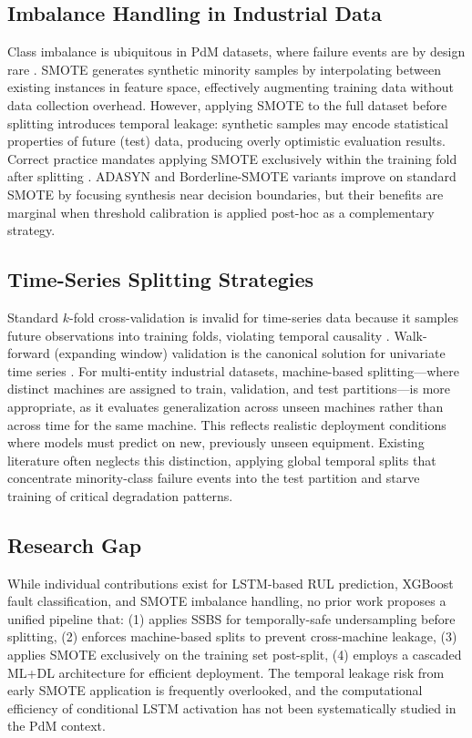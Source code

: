 \documentclass[conference]{IEEEtran}
\begin{document}
\subsection{Imbalance Handling in Industrial Data}
Class imbalance is ubiquitous in PdM datasets, where failure events are by design rare \cite{li2020pdmimbalance, zhang2024imbalanced}. SMOTE \cite{chawla2002smote} generates synthetic minority samples by interpolating between existing instances in feature space, effectively augmenting training data without data collection overhead. However, applying SMOTE to the full dataset before splitting introduces temporal leakage: synthetic samples may encode statistical properties of future (test) data, producing overly optimistic evaluation results. Correct practice mandates applying SMOTE exclusively within the training fold after splitting \cite{blagus2013smote_bias}. ADASYN and Borderline-SMOTE variants improve on standard SMOTE by focusing synthesis near decision boundaries, but their benefits are marginal when threshold calibration is applied post-hoc as a complementary strategy.

\subsection{Time-Series Splitting Strategies}
Standard $k$-fold cross-validation is invalid for time-series data because it samples future observations into training folds, violating temporal causality \cite{bergmeir2018tscv}. Walk-forward (expanding window) validation is the canonical solution for univariate time series \cite{hyndman2018forecasting}. For multi-entity industrial datasets, machine-based splitting—where distinct machines are assigned to train, validation, and test partitions—is more appropriate, as it evaluates generalization across unseen machines rather than across time for the same machine. This reflects realistic deployment conditions where models must predict on new, previously unseen equipment. Existing literature often neglects this distinction, applying global temporal splits that concentrate minority-class failure events into the test partition and starve training of critical degradation patterns.

\subsection{Research Gap}
While individual contributions exist for LSTM-based RUL prediction, XGBoost fault classification, and SMOTE imbalance handling, no prior work proposes a unified pipeline that: (1) applies SSBS for temporally-safe undersampling before splitting, (2) enforces machine-based splits to prevent cross-machine leakage, (3) applies SMOTE exclusively on the training set post-split, (4) employs a cascaded ML+DL architecture for efficient deployment. The temporal leakage risk from early SMOTE application is frequently overlooked, and the computational efficiency of conditional LSTM activation has not been systematically studied in the PdM context.
\end{document}
